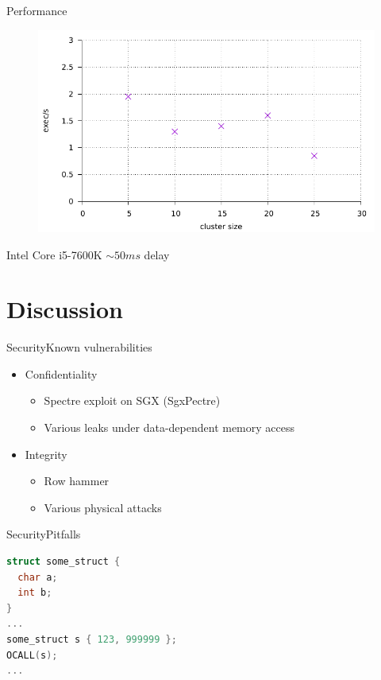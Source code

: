 \documentclass{beamer}
\begin{document}
\begin{frame}{Performance}%
  \begin{figure}[p]
    \includegraphics[width=\textwidth]{figures/d200/d200.pdf}
  \end{figure}
  \centering
  Intel Core i5-7600K \hspace{1cm} $\sim50ms$ delay
\end{frame}

\section{Discussion}

\begin{frame}{Security}{Known vulnerabilities}%
  \begin{itemize}
    \item Confidentiality
    \begin{itemize}
      \item Spectre exploit on SGX (SgxPectre)
      \item Various leaks under data-dependent memory access
    \end{itemize}

    \vfill

    \item Integrity
    \begin{itemize}
      \item Row hammer
      \item Various physical attacks
    \end{itemize}
  \end{itemize}
\end{frame}

\begin{frame}[fragile]{Security}{Pitfalls}%
  \vfill
  \begin{lstlisting}[language=C, basicstyle=\footnotesize\ttfamily, keywordstyle=\color{mLightBrown}]
struct some_struct {
  char a;
  int b;
}
...
some_struct s { 123, 999999 };
OCALL(s);
...
  \end{lstlisting}
  \vfill
\end{frame}
\end{document}
